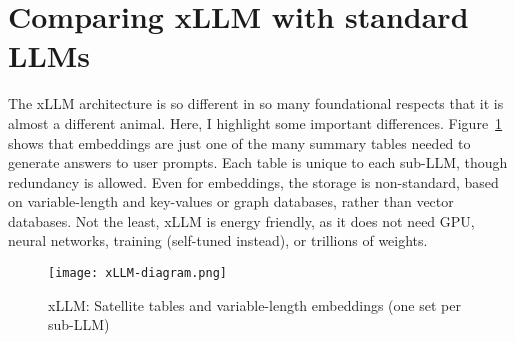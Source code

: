 \documentclass[oneside,10pt]{book}
\begin{document}
\section{Comparing xLLM with standard LLMs}\label{ruipof}

The xLLM architecture is so different in so many foundational respects that it is almost a different animal. Here, I highlight some important differences. 
Figure~\ref{fig:log1frdiag} shows that embeddings are just one of the many summary tables needed  to generate answers to user prompts. Each table is unique to each sub-LLM, though redundancy is allowed. Even for embeddings, the storage is non-standard, based on variable-length and key-values or graph databases, rather than vector databases.   Not the least, xLLM is energy friendly, as it does not need GPU, neural networks, training (self-tuned instead), or trillions of weights.


\begin{figure}[H]
\centering
\texttt{[image: xLLM-diagram.png]}
\caption{xLLM: Satellite tables and variable-length embeddings (one set per sub-LLM)}
\label{fig:log1frdiag}
\end{figure}

\end{document}
